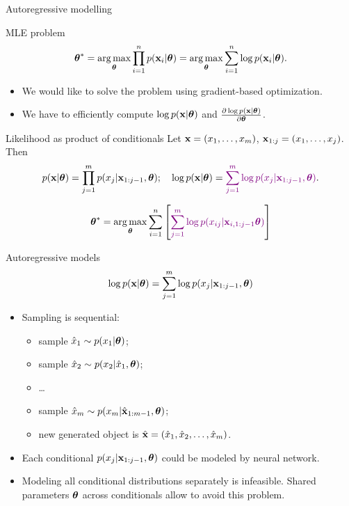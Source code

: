 \begin{frame}{Autoregressive modelling}
    \begin{block}{MLE problem}
	    \vspace{-0.4cm}
	    \[
	        \boldsymbol{\theta}^* = \operatorname*{arg\,max}_{\boldsymbol{\theta}} \prod_{i=1}^n p(\mathbf{x}_i | \boldsymbol{\theta}) = \operatorname*{arg\,max}_{\boldsymbol{\theta}} \sum_{i=1}^n \log p(\mathbf{x}_i | \boldsymbol{\theta}).
	    \]
	    \vspace{-0.5cm}
    \end{block}
    \begin{itemize}
        \item We would like to solve the problem using gradient-based optimization.
        \item We have to efficiently compute $\log p(\mathbf{x} | \boldsymbol{\theta})$ and $\frac{\partial \log p(\mathbf{x} | \boldsymbol{\theta})}{\partial \boldsymbol{\theta}}$.
    \end{itemize}
    \begin{block}{Likelihood as product of conditionals}
    Let $\mathbf{x} = (x_1, \dots, x_m)$, $\mathbf{x}_{1:j} = (x_1, \dots, x_j)$. Then 
    \[
        p(\mathbf{x} | \boldsymbol{\theta}) = \prod_{j=1}^m p(x_j | \mathbf{x}_{1:j - 1}, \boldsymbol{\theta}); \quad 
        \log p(\mathbf{x} | \boldsymbol{\theta}) = {\color{violet}\sum_{j=1}^m \log p(x_j | \mathbf{x}_{1:j - 1}, \boldsymbol{\theta})}.
    \]
    \end{block}
    \vspace{-0.5cm}
	 \[
	     \boldsymbol{\theta}^* =  \operatorname*{arg\,max}_{\boldsymbol{\theta}} \sum_{i=1}^n \left[{\color{violet} \sum_{j=1}^m \log p(x_{ij} | \mathbf{x}_{i, 1:j - 1}\boldsymbol{\theta})}\right]
	 \]
\end{frame}
\begin{frame}{Autoregressive models}
    \[
    \log p(\mathbf{x}| \boldsymbol{\theta}) = \sum_{j=1}^m \log p(x_j | \mathbf{x}_{1:j - 1}, \boldsymbol{\theta})
    \]
    \begin{itemize}
	    \item Sampling is sequential:
	    \begin{itemize}
    		\item sample $\hat{x}_1 \sim p(x_1 | \boldsymbol{\theta})$;
    		\item sample $\hat{x}_2 \sim p(x_2 | \hat{x}_1, \boldsymbol{\theta})$;
    		\item \dots
    		\item sample $\hat{x}_m \sim p(x_m | \hat{\mathbf{x}}_{1:m-1}, \boldsymbol{\theta})$;
    		\item new generated object is $\hat{\mathbf{x}} = (\hat{x}_1, \hat{x}_2, \dots, \hat{x}_m)$.
    	\end{itemize}
        \item Each conditional $p(x_j | \mathbf{x}_{1:j - 1}, \boldsymbol{\theta})$ could be modeled by neural network.
        \item Modeling all conditional distributions separately is infeasible. Shared parameters $\boldsymbol{\theta}$ across conditionals allow to avoid this problem.

    \end{itemize}
\end{frame}
